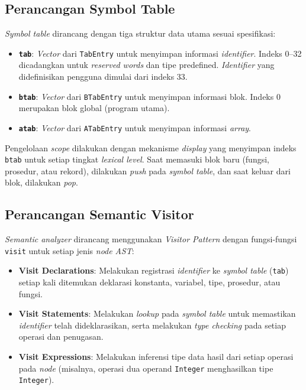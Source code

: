 ﻿\documentclass[12pt,a4paper]{article}
\begin{document}
\subsection{Perancangan Symbol Table}

\textit{Symbol table} dirancang dengan tiga struktur data utama sesuai spesifikasi:

\begin{itemize}
    \item \textbf{\texttt{tab}}: \textit{Vector} dari \texttt{TabEntry} untuk menyimpan informasi \textit{identifier}. Indeks 0--32 dicadangkan untuk \textit{reserved words} dan tipe predefined. \textit{Identifier} yang didefinisikan pengguna dimulai dari indeks 33.
    \item \textbf{\texttt{btab}}: \textit{Vector} dari \texttt{BTabEntry} untuk menyimpan informasi blok. Indeks 0 merupakan blok global (program utama).
    \item \textbf{\texttt{atab}}: \textit{Vector} dari \texttt{ATabEntry} untuk menyimpan informasi \textit{array}.
\end{itemize}

Pengelolaan \textit{scope} dilakukan dengan mekanisme \textit{display} yang menyimpan indeks \texttt{btab} untuk setiap tingkat \textit{lexical level}. Saat memasuki blok baru (fungsi, prosedur, atau rekord), dilakukan \textit{push} pada \textit{symbol table}, dan saat keluar dari blok, dilakukan \textit{pop}.

\subsection{Perancangan Semantic Visitor}

\textit{Semantic analyzer} dirancang menggunakan \textit{Visitor Pattern} dengan fungsi-fungsi \texttt{visit} untuk setiap jenis \textit{node} \textit{AST}:

\begin{itemize}
    \item \textbf{Visit Declarations}: Melakukan registrasi \textit{identifier} ke \textit{symbol table} (\texttt{tab}) setiap kali ditemukan deklarasi konstanta, variabel, tipe, prosedur, atau fungsi.
    \item \textbf{Visit Statements}: Melakukan \textit{lookup} pada \textit{symbol table} untuk memastikan \textit{identifier} telah dideklarasikan, serta melakukan \textit{type checking} pada setiap operasi dan penugasan.
    \item \textbf{Visit Expressions}: Melakukan inferensi tipe data hasil dari setiap operasi pada \textit{node} (misalnya, operasi dua operand \texttt{Integer} menghasilkan tipe \texttt{Integer}).
\end{itemize}
\end{document}

